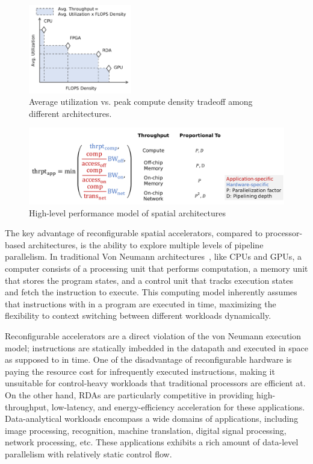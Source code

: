 \begin{figure}
\centering
\includegraphics[width=0.4\textwidth]{figs/peakutil.pdf}
\caption[Average utilization vs. peak compute density tradeoff]{
 Average utilization vs. peak compute density tradeoff among different architectures.
}
\label{fig:peakutil}
\end{figure}

\begin{figure}
\centering
\includegraphics[width=1\textwidth]{figs/perfmodel.pdf}
\caption[High-level performance model of spatial architectures]{
High-level performance model of spatial architectures
}
\label{fig:perfmodel}
\end{figure}

The key advantage of reconfigurable spatial accelerators, compared to processor-based architectures, 
is the ability to explore multiple levels of pipeline parallelism. 
In traditional Von Neumann architectures~\cite{vonneumann}, like CPUs and GPUs,
a computer consists of a processing unit that performs
computation, a memory unit that stores the program states, and a control unit that tracks execution
states and fetch the instruction to execute. This computing model inherently assumes that
instructions with in a program are executed in time, maximizing the flexibility to 
context switching between different workloads dynamically.

Reconfigurable accelerators are a direct violation of the von Neumann execution model; 
instructions are statically imbedded in the datapath and executed in space as supposed to in time.
One of the disadvantage of reconfigurable hardware is paying the resource cost for infrequently
executed instructions, making it unsuitable for control-heavy workloads that traditional
processors are efficient at.
On the other hand, RDAs are particularly competitive in providing high-throughput, 
low-latency, and energy-efficiency acceleration for these applications.
Data-analytical workloads encompass a wide domains of applications, including image processing,
recognition, machine translation, digital signal processing, network processing, etc.
These applications exhibits a rich amount of data-level parallelism with relatively static control
flow.

